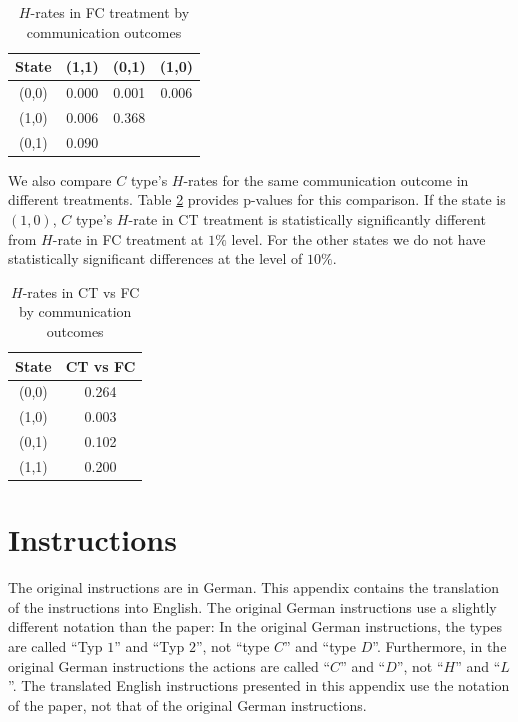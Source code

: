 \documentclass[12pt]{article}
\theoremstyle{break}
\begin{document}
\begin{table}[h!]
\begin{center}
	\begin{tabular}{c | c c c}
			State & (1,1) & (0,1) & (1,0) \\
			\hline
			(0,0) & 0.000 & 0.001	& 0.006\\
			(1,0) & 0.006 & 0.368 & \\ 
			(0,1) & 0.090 &  & \\ 
	\end{tabular}
	\end{center}
	\caption{$H$-rates in FC treatment by communication outcomes}		\label{H_FC_MW}
\end{table}

We also compare $C$ type's $H$-rates for the same communication outcome in different treatments. Table \ref{H_CT_FC_MW} provides p-values for this comparison. If the state is $(1,0)$, $C$ type's $H$-rate in CT treatment is statistically significantly different from $H$-rate in FC treatment at $1\%$ level. For the other states we do not have statistically significant differences at the level of $10\%$.

\begin{table}[h!]
\begin{center}
	\begin{tabular}{c | c }
			State & CT vs FC \\
			\hline
			(0,0) & 0.264 \\
			(1,0) & 0.003  \\ 
			(0,1) & 0.102 \\ 
			(1,1) & 0.200 \\ 
	\end{tabular}
	\end{center}
	\caption{$H$-rates in CT vs FC by communication outcomes}	\label{H_CT_FC_MW}
\end{table}

%   
%    
\newpage
\section{Instructions}

The original instructions are in German. This appendix contains the translation of the instructions into English. The original German instructions use a slightly different notation than the paper: In the original German instructions, the types are called ``Typ $1$'' and ``Typ $2$'', not ``type $C$'' and ``type $D$''. Furthermore, in the original German instructions the actions are called ``$C$'' and ``$D$'', not ``$H$'' and ``$L$''. The translated English instructions presented in this appendix use the notation of the paper, not that of the original German instructions.
\end{document}
